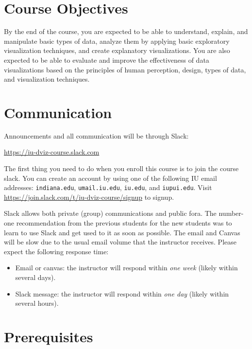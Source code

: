 \documentclass[11pt,article,oneside]{memoir} %
\begin{document}
\section{Course Objectives}%

By the end of the course, you are expected to be able to understand, explain, and manipulate basic types of data, analyze them by applying basic exploratory visualization techniques, and create explanatory visualizations. 
You are also expected to be able to evaluate and improve the effectiveness of data visualizations based on the principles of human perception, design, types of data, and visualization techniques. 
 

\section{Communication} %

Announcements and all communication will be through Slack: 

\url{https://iu-dviz-course.slack.com}

The first thing you need to do when you enroll this course is to join the course slack. You can create an account by using one of the following IU email addresses: \texttt{indiana.edu}, \texttt{umail.iu.edu}, \texttt{iu.edu}, and \texttt{iupui.edu}. Visit \url{https://join.slack.com/t/iu-dviz-course/signup} to signup.

Slack allows both private (group) communications and public fora. The number-one recommendation from the previous students for the new students was to learn to use Slack and get used to it as soon as possible. The email and Canvas will be slow due to the usual email volume that the instructor receives. Please expect the following response time:

\begin{itemize}
\item Email or canvas: the instructor will respond within \emph{one week} (likely within several days).
\item Slack message: the instructor will respond within \emph{one day} (likely within several hours).

\end{itemize}

\section{Prerequisites}%
\label{sec:Prerequisites}
\end{document}
